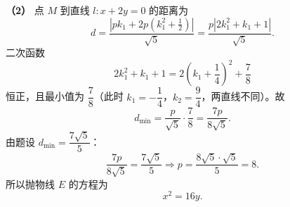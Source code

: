 \begin{answer}
\textbf{（2）} 点 $M$ 到直线 $l:x+2y=0$ 的距离为
\nopagebreak[4]
\[d=\frac{\left|pk_1+2p\left(k_1^2+\frac12\right)\right|}{\sqrt5}
=\frac{p\left|2k_1^2+k_1+1\right|}{\sqrt5}.\]
二次函数
\nopagebreak[4]
\[2k_1^2+k_1+1=2\left(k_1+\frac14\right)^2+\frac78\]
恒正，且最小值为 $\dfrac78$（此时 $k_1=-\dfrac14$，$k_2=\dfrac94$，两直线不同）。故
\nopagebreak[4]
\[d_{\min}=\frac{p}{\sqrt5}\cdot\frac78=\frac{7p}{8\sqrt5}.\]
由题设 $d_{\min}=\dfrac{7\sqrt5}{5}$：
\nopagebreak[4]
\[\frac{7p}{8\sqrt5}=\frac{7\sqrt5}{5}
\Longrightarrow p=\frac{8\sqrt5\cdot\sqrt5}{5}=8.\]
所以抛物线 $E$ 的方程为
\nopagebreak[4]
\[x^2=16y.\]



\end{answer}
